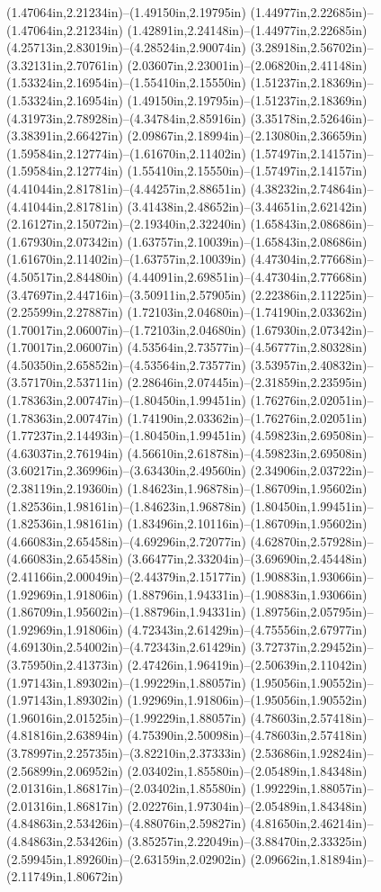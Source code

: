 (1.47064in,2.21234in)--(1.49150in,2.19795in) (1.44977in,2.22685in)--(1.47064in,2.21234in) (1.42891in,2.24148in)--(1.44977in,2.22685in) (4.25713in,2.83019in)--(4.28524in,2.90074in) (3.28918in,2.56702in)--(3.32131in,2.70761in) (2.03607in,2.23001in)--(2.06820in,2.41148in) (1.53324in,2.16954in)--(1.55410in,2.15550in) (1.51237in,2.18369in)--(1.53324in,2.16954in) (1.49150in,2.19795in)--(1.51237in,2.18369in) (4.31973in,2.78928in)--(4.34784in,2.85916in) (3.35178in,2.52646in)--(3.38391in,2.66427in) (2.09867in,2.18994in)--(2.13080in,2.36659in) (1.59584in,2.12774in)--(1.61670in,2.11402in) (1.57497in,2.14157in)--(1.59584in,2.12774in) (1.55410in,2.15550in)--(1.57497in,2.14157in) (4.41044in,2.81781in)--(4.44257in,2.88651in) (4.38232in,2.74864in)--(4.41044in,2.81781in) (3.41438in,2.48652in)--(3.44651in,2.62142in) (2.16127in,2.15072in)--(2.19340in,2.32240in) (1.65843in,2.08686in)--(1.67930in,2.07342in) (1.63757in,2.10039in)--(1.65843in,2.08686in) (1.61670in,2.11402in)--(1.63757in,2.10039in) (4.47304in,2.77668in)--(4.50517in,2.84480in) (4.44091in,2.69851in)--(4.47304in,2.77668in) (3.47697in,2.44716in)--(3.50911in,2.57905in) (2.22386in,2.11225in)--(2.25599in,2.27887in) (1.72103in,2.04680in)--(1.74190in,2.03362in) (1.70017in,2.06007in)--(1.72103in,2.04680in) (1.67930in,2.07342in)--(1.70017in,2.06007in) (4.53564in,2.73577in)--(4.56777in,2.80328in) (4.50350in,2.65852in)--(4.53564in,2.73577in) (3.53957in,2.40832in)--(3.57170in,2.53711in) (2.28646in,2.07445in)--(2.31859in,2.23595in) (1.78363in,2.00747in)--(1.80450in,1.99451in) (1.76276in,2.02051in)--(1.78363in,2.00747in) (1.74190in,2.03362in)--(1.76276in,2.02051in) (1.77237in,2.14493in)--(1.80450in,1.99451in) (4.59823in,2.69508in)--(4.63037in,2.76194in) (4.56610in,2.61878in)--(4.59823in,2.69508in) (3.60217in,2.36996in)--(3.63430in,2.49560in) (2.34906in,2.03722in)--(2.38119in,2.19360in) (1.84623in,1.96878in)--(1.86709in,1.95602in) (1.82536in,1.98161in)--(1.84623in,1.96878in) (1.80450in,1.99451in)--(1.82536in,1.98161in) (1.83496in,2.10116in)--(1.86709in,1.95602in) (4.66083in,2.65458in)--(4.69296in,2.72077in) (4.62870in,2.57928in)--(4.66083in,2.65458in) (3.66477in,2.33204in)--(3.69690in,2.45448in) (2.41166in,2.00049in)--(2.44379in,2.15177in) (1.90883in,1.93066in)--(1.92969in,1.91806in) (1.88796in,1.94331in)--(1.90883in,1.93066in) (1.86709in,1.95602in)--(1.88796in,1.94331in) (1.89756in,2.05795in)--(1.92969in,1.91806in) (4.72343in,2.61429in)--(4.75556in,2.67977in) (4.69130in,2.54002in)--(4.72343in,2.61429in) (3.72737in,2.29452in)--(3.75950in,2.41373in) (2.47426in,1.96419in)--(2.50639in,2.11042in) (1.97143in,1.89302in)--(1.99229in,1.88057in) (1.95056in,1.90552in)--(1.97143in,1.89302in) (1.92969in,1.91806in)--(1.95056in,1.90552in) (1.96016in,2.01525in)--(1.99229in,1.88057in) (4.78603in,2.57418in)--(4.81816in,2.63894in) (4.75390in,2.50098in)--(4.78603in,2.57418in) (3.78997in,2.25735in)--(3.82210in,2.37333in) (2.53686in,1.92824in)--(2.56899in,2.06952in) (2.03402in,1.85580in)--(2.05489in,1.84348in) (2.01316in,1.86817in)--(2.03402in,1.85580in) (1.99229in,1.88057in)--(2.01316in,1.86817in) (2.02276in,1.97304in)--(2.05489in,1.84348in) (4.84863in,2.53426in)--(4.88076in,2.59827in) (4.81650in,2.46214in)--(4.84863in,2.53426in) (3.85257in,2.22049in)--(3.88470in,2.33325in) (2.59945in,1.89260in)--(2.63159in,2.02902in) (2.09662in,1.81894in)--(2.11749in,1.80672in) 